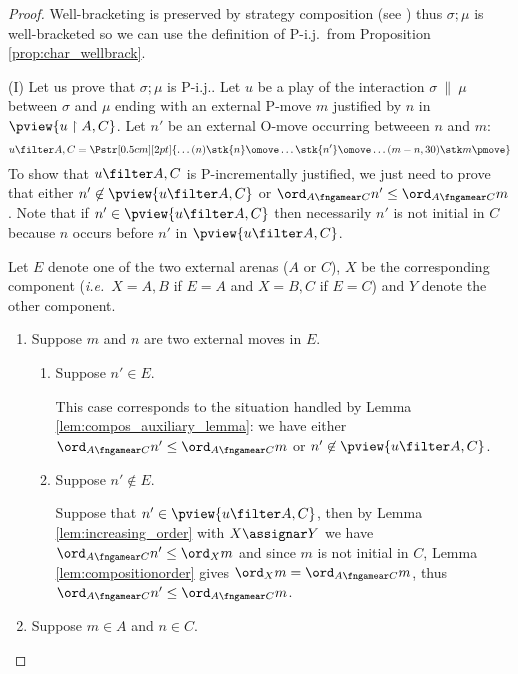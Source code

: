 \begin{proof}
Well-bracketing is preserved by strategy composition (see \cite[Proposition 2.5]{abramsky94full}) thus
$\sigma ; \mu$ is well-bracketed so we can use the definition of P-i.j.\ from Proposition \ref{prop:char_wellbrack}.

\noindent (I) Let us prove that $\sigma ; \mu$ is P-i.j..
Let $u$ be a play of the interaction $\sigma\ \|\ \mu$ between $\sigma$ and $\mu$
ending with an external P-move $m$
justified by $n$ in $\pview{u \upharpoonright A , C}$.
Let $n'$ be an external O-move occurring betweeen $n$ and $m$:
$$ u \filter A,C =
\Pstr[0.5cm][2pt]{ \ldots (n){\stk {n} \omove}  \ldots
 {\stk {n'} \omove}  \ldots  (m-n,30){\stk m \pmove}
}
$$
To show that $u \filter A,C$ is P-incrementally justified, we just need to prove that either $n'\not\in \pview{u \filter A,C}$ or $\ord_{A\fngamear C} n' \leq \ord_{A\fngamear C} m$.
Note that if $n'\in \pview{u \filter A,C}$
then necessarily $n'$ is not initial
in $C$ because $n$ occurs before $n'$ in
$\pview{u \filter A,C}$.

Let $E$ denote one of the two external arenas ($A$ or $C$), $X$ be
the corresponding component ({\it i.e.}~$X=A,B$ if $E=A$ and $X=B,C$
if $E=C$) and $Y$ denote the other component.
    \begin{enumerate}[1)]
    \item Suppose $m$ and $n$ are two external moves in $E$.

        \begin{enumerate}[{1}.a)]
        \item Suppose $n' \in E$.

        This case corresponds to the situation handled by Lemma \ref{lem:compos_auxiliary_lemma}: we have either $\ord_{A\fngamear C} n' \leq \ord_{A\fngamear C} m$
        or $n' \not\in \pview{u \filter A,C}$.

        \item Suppose $n' \not\in E$.

        Suppose that $n' \in \pview{u\filter A,C}$, then by
        Lemma \ref{lem:increasing_order} with $X\assignar Y$ we have $ \ord_{A\fngamear C} n'  \leq \ord_X m$
        and since $m$ is not initial in $C$, Lemma \ref{lem:compositionorder} gives $\ord_X m = \ord_{A\fngamear C} m$, thus $\ord_{A\fngamear C} n' \leq \ord_{A\fngamear C} m$.
        \end{enumerate}

        \item \label{case:mA} Suppose $m \in A$ and $n \in C$.


\end{enumerate}
\end{proof}
